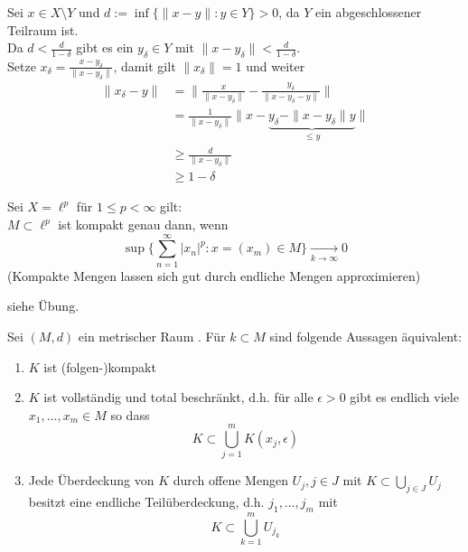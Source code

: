\begin{beweis}
	Sei $x \in X \setminus Y$ und $d := \inf \{ \| x - y \|: y \in Y \} > 0$, da $Y$ ein abgeschlossener Teilraum ist. \\
	Da $ d < \frac{d}{1 - \delta}$ gibt es ein $y_{\delta} \in Y$ mit $\| x - y_{\delta} \| < \frac{d}{1 -  \delta}$. \\ 
	Setze $x_{\delta} = \frac{x - y_{\delta}}{\| x - y_{\delta} \|}$, damit gilt $\| x_{\delta} \| = 1$ und weiter 
	\begin{align*}
		\| x_{\delta} - y \| & = \| \frac{x}{\| x - y_{\delta} \|} - \frac{y_\delta}{\| x - y_{\delta} - y\|} \|	\\
			& = \frac{1}{\| x - y_{\delta} \|} \| x - \underbrace{y_{\delta} - \| x - y_{\delta} \| y}_{\leq y} \| \\
			& \geq \frac{d}{\| x - y_{\delta} \|} \\
			& \geq 1 - \delta
	\end{align*}
\end{beweis}


\begin{beispiel} \label{bsp:6.4}
	Sei $X = \ell^{p}$ für $1 \leq p < \infty$ gilt: \\
	$M \subset \ell^{p}$ ist kompakt genau dann, wenn
	\[ \sup \{ \sum_{ n = 1}^{\infty} |x_{n}|^{p} : x = (x_{m}) \in M \} \xrightarrow[k \rightarrow \infty]{} 0 \]	
	(Kompakte Mengen lassen sich gut durch endliche Mengen approximieren)
\end{beispiel}

\begin{beweis}
	siehe Übung.	
\end{beweis}


\begin{satz} \label{satz:6.5}
	Sei $(M, d)$ ein metrischer Raum . Für $k \subset M$ sind folgende Aussagen äquivalent:
	\begin{enumerate}[label=\alph*\upshape)]
		\label{satz:6.5a}
		\item $K$ ist (folgen-)kompakt 
		\label{satz:6.5b}
		\item $K$ ist vollständig und total beschränkt, d.h. für alle $\epsilon > 0$ gibt es endlich viele $x_{1}, \dotsc, x_{m} \in M$ so dass
			\[ K \subset \bigcup_{j = 1}^{m} K(x_{j}, \epsilon) \]
		\label{satz:6.5c}
		\item Jede Überdeckung von $K$ durch offene Mengen $U_{j}, j \in J$ mit $K \subset \bigcup_{j \in J} U_{j}$ besitzt eine endliche Teilüberdeckung, d.h. $j_{1}, \dotsc, j_{m}$ mit
			\[ K \subset \bigcup_{k = 1}^{m} U_{j_{k}} \]
	\end{enumerate}
\end{satz}

